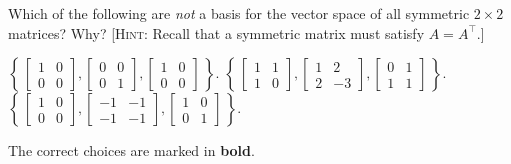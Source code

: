 \begin{questions}
  \question Which of the following are \emph{not} a basis for the vector
  space of all symmetric $2\times 2$ matrices? Why? [\textsc{Hint}: Recall
  that a symmetric matrix must satisfy $A=A^\intercal$.]
  \begin{choices}
    \choice
    $\displaystyle\left\{\,
      \begin{bmatrix}1&0\\0&0\end{bmatrix},
      \begin{bmatrix}0&0\\0&1\end{bmatrix},
      \begin{bmatrix}1&0\\0&0\end{bmatrix}
      \,\right\}$.
    \CorrectChoice
    $\displaystyle\left\{\,
      \begin{bmatrix}1&1\\1&0\end{bmatrix},
      \begin{bmatrix}1&2\\2&-3\end{bmatrix},
      \begin{bmatrix}0&1\\1&1\end{bmatrix}
      \,\right\}$.
    \CorrectChoice
    $\displaystyle\left\{\,
      \begin{bmatrix}1&0\\0&0\end{bmatrix},
      \begin{bmatrix}-1&-1\\-1&-1\end{bmatrix},
      \begin{bmatrix}1&0\\0&1\end{bmatrix}
      \,\right\}$.
  \end{choices}
  \begin{solution}
    The correct choices are marked in \textbf{bold}.


\end{solution}
\end{questions}
